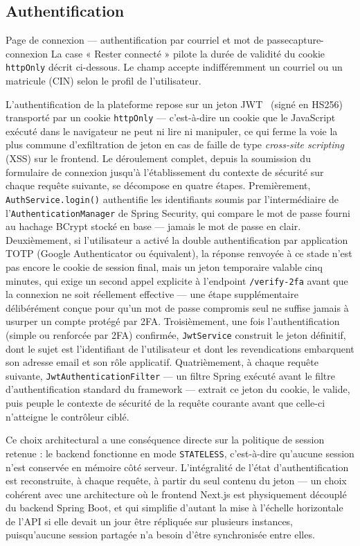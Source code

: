 \subsection{Authentification}

  {Page de connexion --- authentification par courriel et mot de passe}{capture-connexion}
  {La case « Rester connecté » pilote la durée de validité du cookie
   \texttt{httpOnly} décrit ci-dessous. Le champ accepte indifféremment un
   courriel ou un matricule (CIN) selon le profil de l'utilisateur.}

L'authentification de la plateforme repose sur un jeton JWT~\cite{jwt-rfc7519}
(signé en HS256) transporté par un cookie \texttt{httpOnly} --- c'est-à-dire un
cookie que le JavaScript exécuté dans le navigateur ne peut ni lire ni
manipuler, ce qui ferme la voie la plus commune d'exfiltration de jeton en
cas de faille de type \emph{cross-site scripting} (XSS) sur le frontend.
Le déroulement complet, depuis la soumission du formulaire de connexion
jusqu'à l'établissement du contexte de sécurité sur chaque requête
suivante, se décompose en quatre étapes. Premièrement,
\texttt{AuthService.login()} authentifie les identifiants soumis par
l'intermédiaire de l'\texttt{AuthenticationManager} de Spring Security,
qui compare le mot de passe fourni au hachage BCrypt stocké en base ---
jamais le mot de passe en clair. Deuxièmement, si l'utilisateur a activé
la double authentification par application TOTP (Google Authenticator ou
équivalent), la réponse renvoyée à ce stade n'est pas encore le cookie de
session final, mais un jeton temporaire valable cinq minutes, qui exige un
second appel explicite à l'endpoint \texttt{/verify-2fa} avant que la
connexion ne soit réellement effective --- une étape supplémentaire
délibérément conçue pour qu'un mot de passe compromis seul ne suffise
jamais à usurper un compte protégé par 2FA. Troisièmement, une fois
l'authentification (simple ou renforcée par 2FA) confirmée,
\texttt{JwtService} construit le jeton définitif, dont le sujet est
l'identifiant de l'utilisateur et dont les revendications embarquent son
adresse email et son rôle applicatif. Quatrièmement, à chaque requête
suivante, \texttt{JwtAuthenticationFilter} --- un filtre Spring exécuté
avant le filtre d'authentification standard du framework --- extrait ce
jeton du cookie, le valide, puis peuple le contexte de sécurité de la
requête courante avant que celle-ci n'atteigne le contrôleur ciblé.

Ce choix architectural a une conséquence directe sur la politique de
session retenue : le backend fonctionne en mode \texttt{STATELESS},
c'est-à-dire qu'aucune session n'est conservée en mémoire côté serveur.
L'intégralité de l'état d'authentification est reconstruite, à chaque
requête, à partir du seul contenu du jeton --- un choix cohérent avec une
architecture où le frontend Next.js est physiquement découplé du backend
Spring Boot, et qui simplifie d'autant la mise à l'échelle horizontale de
l'API si elle devait un jour être répliquée sur plusieurs instances,
puisqu'aucune session partagée n'a besoin d'être synchronisée entre elles.

